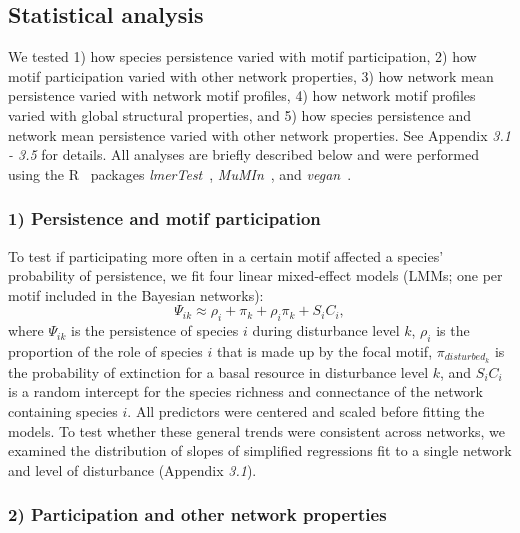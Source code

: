 \documentclass[12pt]{article}
\begin{document}
\begin{spacing}{2.0}
	\subsection*{Statistical analysis} 

	We tested 1) how species persistence varied with motif participation, 2) how motif participation varied with other network properties, 3) how network mean persistence varied with network motif profiles, 4) how network motif profiles varied with global structural properties, and 5) how species persistence and network mean persistence varied with other network properties.
	See Appendix \emph{3.1 - 3.5} for details. 
	All analyses are briefly described below and were performed using the R~\citep{R} packages \emph{lmerTest}~\citep{lmerTest}, \emph{MuMIn}~\citep{MuMIn}, and \emph{vegan}~\citep{vegan}.

    
    \subsubsection*{1) Persistence and motif participation}

        To test if participating more often in a certain motif affected a species' probability of persistence, we fit four linear mixed-effect models (LMMs; one per motif included in the Bayesian networks):
            \begin{equation}
                \Psi_{ik} \approx \rho_{i} + \pi_{k} + \rho_{i}\pi_{k} +
                S_{i}C_{i} ,
                \label{propreq}
            \end{equation}
        \noindent where $\Psi_{ik}$ is the persistence of species $i$ during disturbance level $k$, $\rho_{i}$ is the proportion of the role of species $i$ that is made up by the focal motif, $\pi_{disturbed_k}$ is the probability of extinction for a basal resource in disturbance level $k$, and $S_{i}C_{i}$ is a random intercept for the species richness and connectance of the network containing species $i$.
        All predictors were centered and scaled before fitting the models.         
        To test whether these general trends were consistent across networks, we examined the distribution of slopes of simplified regressions fit to a single network and level of disturbance (Appendix \emph{3.1}).
    
    \subsubsection*{2) Participation and other network properties}    



\end{spacing}
\end{document}
